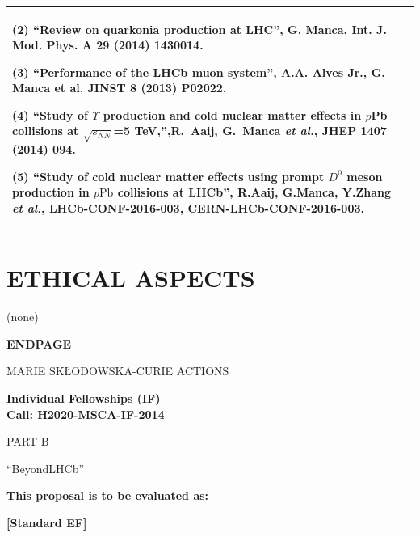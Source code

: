 \documentclass[a4paper,11pt]{article}
\newcommand{\acronym}{{\sc BeyondLHCb}\xspace} %
\begin{document}
{\begin{tabular}{>{\raggedright}p{}p{}}
(2) “Review on quarkonia production at LHC”, G. Manca, Int. J. Mod. Phys. A 29 (2014) 1430014.

(3) “Performance of the LHCb muon system”, A.A. Alves Jr., G. Manca et al. JINST 8 (2013) P02022.

(4) ``Study of $\Upsilon$ production and cold nuclear matter effects in $p$Pb collisions at $\sqrt{s_{NN}}$=5 TeV,'',R.~Aaij, G.~Manca {\it et al.}, JHEP {\bf 1407} (2014) 094.

(5) ``Study of cold nuclear matter effects using prompt $D^0$ meson production in $p\mathrm{Pb}$ collisions at LHCb'', R.Aaij, G.Manca, Y.Zhang {\it et al.},  LHCb-CONF-2016-003, CERN-LHCb-CONF-2016-003.
\\\bottomrule
\end{tabular}
}
\vspace{\baselineskip}


\section{ETHICAL ASPECTS}

(none)


\newpage
\vspace{15mm}
\begin{center}


        \Large{
      
     
        \textbf{ENDPAGE}
  
          \vspace{15mm}
          MARIE SKŁODOWSKA-CURIE ACTIONS\\
          \vspace{1cm}
          
          \textbf{Individual Fellowships (IF)}\\
          \textbf{Call: H2020-MSCA-IF-2014}
          \vspace{2cm}                   

          PART B
          \vspace{2.5cm}

          ``\acronym''
          \vspace{2cm}

          \textbf{This proposal is to be evaluated as:}
          \vspace{.5cm}

          \textbf{[Standard EF]}
        }

  \end{center}
\vspace{1cm}
\end{document}
